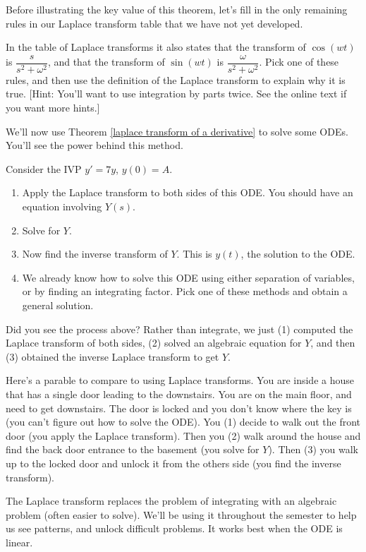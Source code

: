 Before illustrating the key value of this theorem, let's fill in the only remaining rules in our Laplace transform table that we have not yet developed. 
\begin{problem}
 In the table of Laplace transforms it also states that the transform of 
$\cos(wt)$ is $\dfrac{s}{s^2+\omega^2}$, and that the transform of $\sin(wt)$  is $\dfrac{\omega}{s^2+\omega^2}$. Pick one of these rules, and then use the definition of the Laplace transform to explain why it is true.  [Hint:  You'll want to use integration by parts twice. See the online text if you want more hints.]
\end{problem}

We'll now use Theorem \ref{laplace transform of a derivative} to solve some ODEs.  You'll see the power behind this method.
\begin{problem}
 Consider the IVP $y'=7y$, $y(0)=A$.  
\begin{enumerate}
 \item Apply the Laplace transform to both sides of this ODE.  You should have an equation involving $Y(s)$. 
 \item Solve for $Y$.  
 \item Now find the inverse transform of $Y$. This is $y(t)$, the solution to the ODE.
 \item We already know how to solve this ODE using either separation of variables, or by finding an integrating factor. Pick one of these methods and obtain a general solution.
\end{enumerate}
\end{problem}
Did you see the process above?  Rather than integrate, we just (1) computed the Laplace transform of both sides, (2) solved an algebraic equation for $Y$, and then (3) obtained the inverse Laplace transform to get $Y$.  

Here's a parable to compare to using Laplace transforms.  You are inside a house that has a single door leading to the downstairs.  You are on the main floor, and need to get downstairs.  The door is locked and you don't know where the key is (you can't figure out how to solve the ODE).  You (1) decide to walk out the front door (you apply the Laplace transform).  Then you (2) walk around the house and find the back door entrance to the basement (you solve for $Y$).  Then (3) you walk up to the locked door and unlock it from the others side (you find the inverse transform).

The Laplace transform replaces the problem of integrating with an algebraic problem (often easier to solve). We'll be using it throughout the semester to help us see patterns, and unlock difficult problems.  It works best when the ODE is linear.

